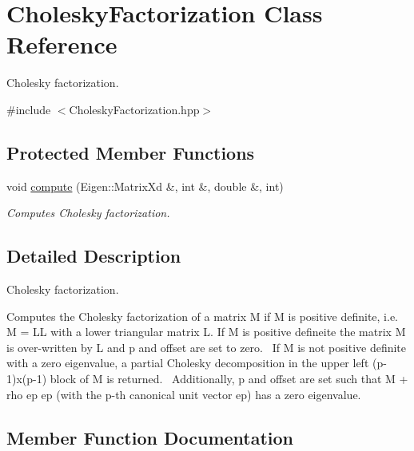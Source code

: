 \hypertarget{class_cholesky_factorization}{}\section{Cholesky\+Factorization Class Reference}
\label{class_cholesky_factorization}


Cholesky factorization.  




{\ttfamily \#include $<$Cholesky\+Factorization.\+hpp$>$}

\subsection*{Protected Member Functions}
\begin{DoxyCompactItemize}
\item 
void \hyperlink{class_cholesky_factorization_a5b851a6c66fa2e815ed13c69e37560d8}{compute} (Eigen\+::\+Matrix\+Xd \&, int \&, double \&, int)
\begin{DoxyCompactList}\small\item\em Computes Cholesky factorization. \end{DoxyCompactList}\end{DoxyCompactItemize}


\subsection{Detailed Description}
Cholesky factorization. 

Computes the Cholesky factorization of a matrix M if M is positive definite, i.\+e. M = LL\textquotesingle{} with a lower triangular matrix L. If M is positive defineite the matrix M is over-\/written by L and p and offset are set to zero.~\newline
If M is not positive definite with a zero eigenvalue, a partial Cholesky decomposition in the upper left (p-\/1)x(p-\/1) block of M is returned.~\newline
 Additionally, p and offset are set such that M + rho ep ep\textquotesingle{} (with the p-\/th canonical unit vector ep) has a zero eigenvalue. 

\subsection{Member Function Documentation}
